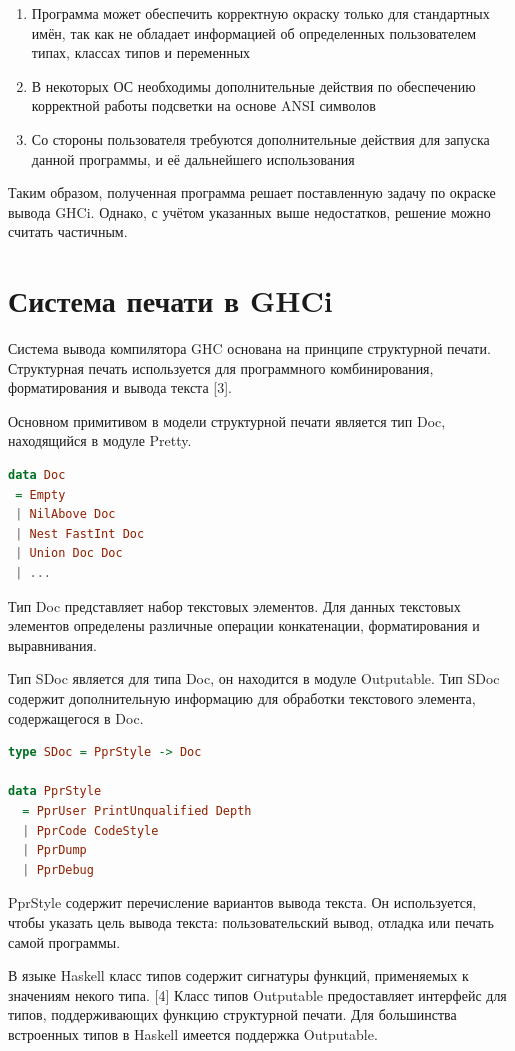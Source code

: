 \begin{enumerate}
\item Программа может обеспечить корректную окраску только для стандартных имён, так как не обладает информацией об определенных пользователем типах, классах типов и переменных
\item В некоторых ОС необходимы дополнительные действия по обеспечению корректной работы подсветки на основе ANSI символов
\item Со стороны пользователя требуются дополнительные действия для запуска данной программы, и её дальнейшего использования
\end{enumerate}

Таким образом, полученная программа решает поставленную задачу по окраске вывода GHCi. Однако, с учётом указанных выше недостатков, решение можно считать частичным.

\section{Система печати в GHCi}
Система вывода компилятора GHC основана на принципе структурной печати. Структурная печать используется для программного комбинирования, форматирования и вывода текста [3].

Основном примитивом в модели структурной печати является тип Doc, находящийся в модуле Pretty.
\begin{lstlisting}[language=Haskell]
data Doc
 = Empty
 | NilAbove Doc
 | Nest FastInt Doc
 | Union Doc Doc
 | ...
\end{lstlisting}

Тип Doc представляет набор текстовых элементов. Для данных текстовых элементов определены различные операции конкатенации, форматирования и выравнивания.

Тип SDoc является для типа Doc, он находится в модуле Outputable. Тип SDoc содержит дополнительную информацию для обработки текстового элемента, содержащегося в Doc.
\begin{lstlisting}[language=Haskell]
type SDoc = PprStyle -> Doc

data PprStyle
  = PprUser PrintUnqualified Depth
  | PprCode CodeStyle
  | PprDump
  | PprDebug
\end{lstlisting}

PprStyle содержит перечисление вариантов вывода текста. Он используется, чтобы указать цель вывода текста: пользовательский вывод, отладка или печать самой программы.

В языке Haskell класс типов содержит сигнатуры функций, применяемых к значениям некого типа. [4] Класс типов Outputable предоставляет интерфейс для типов, поддерживающих функцию структурной печати. Для большинства встроенных типов в Haskell имеется поддержка Outputable.

